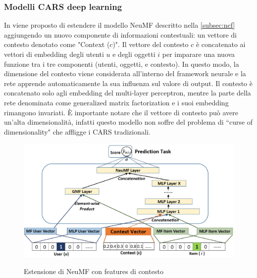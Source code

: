 \subsubsection{Modelli CARS deep learning}
In \cite{context-aware-deep-learning} viene proposto di estendere il modello NeuMF \cite{NCF} descritto nella \autoref{subsec:ncf} aggiungendo un nuovo componente di informazioni contestuali: un vettore di contesto denotato come "Context ($c$)". Il vettore del contesto $c$ è concatenato ai vettori di embedding degli utenti $u$ e degli oggetti $i$ per imparare una nuova funzione tra i tre componenti (utenti, oggetti, e contesto). In questo modo, la dimensione del contesto viene considerata all'interno del framework neurale e la rete apprende automaticamente la sua influenza sul valore di output. Il contesto è concatenato solo agli embedding del multi-layer perceptron, mentre la parte della rete denominata come generalized matrix factorization e i suoi embedding rimangono invariati. \`E importante notare che il vettore di contesto può avere un'alta dimensionalità, infatti questo modello non soffre del problema di ``curse of dimensionality" che affligge i CARS tradizionali.
\begin{figure}
  \centering
  \includegraphics[width=\linewidth]{immagini/cars-ncf.png}
  \caption{Estensione di NeuMF con features di contesto}
  \label{fig:context-neumf}
  \cite{context-aware-deep-learning}
\end{figure}

